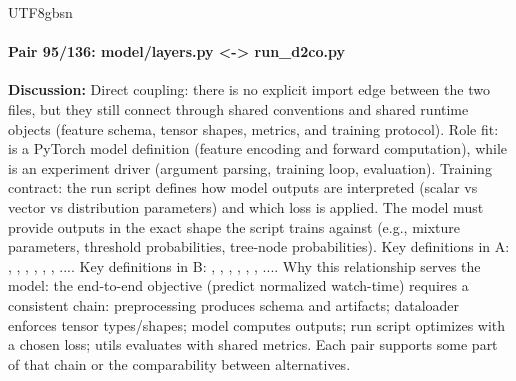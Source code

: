 \documentclass[11pt]{article}
\begin{document}
\begin{CJK*}{UTF8}{gbsn}
\paragraph{Pair 95/136: model/layers.py <-> run\_d2co.py}
\textbf{Discussion:} Direct coupling: there is no explicit import edge between the two files, but they still connect through shared conventions and shared runtime objects (feature schema, tensor shapes, metrics, and training protocol). Role fit: \texttt{} is a PyTorch model definition (feature encoding and forward computation), while \texttt{} is an experiment driver (argument parsing, training loop, evaluation). Training contract: the run script defines how model outputs are interpreted (scalar vs vector vs distribution parameters) and which loss is applied. The model must provide outputs in the exact shape the script trains against (e.g., mixture parameters, threshold probabilities, tree-node probabilities). Key definitions in A: \texttt{}, \texttt{}, \texttt{}, \texttt{}, \texttt{}, \texttt{}, .... Key definitions in B: \texttt{}, \texttt{}, \texttt{}, \texttt{}, \texttt{}, \texttt{}, .... Why this relationship serves the model: the end-to-end objective (predict normalized watch-time) requires a consistent chain: preprocessing produces schema and artifacts; dataloader enforces tensor types/shapes; model computes outputs; run script optimizes with a chosen loss; utils evaluates with shared metrics. Each pair supports some part of that chain or the comparability between alternatives.


\end{CJK*}
\end{document}
